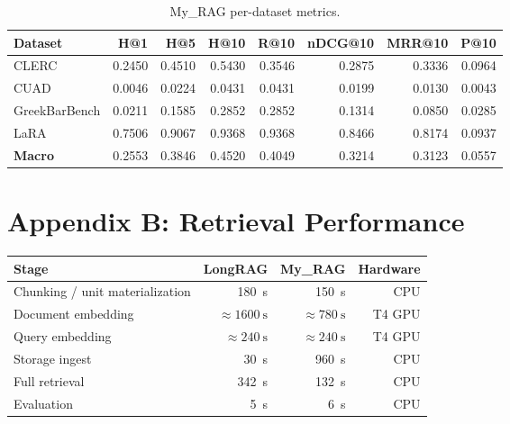 \documentclass[11pt,a4paper]{article}
\begin{document}
\begin{table}[h]
\centering
\caption{My\_RAG per-dataset metrics.}
\small
\begin{tabular}{l r r r r r r r}
\toprule
\textbf{Dataset} & \textbf{H@1} & \textbf{H@5} & \textbf{H@10}
  & \textbf{R@10} & \textbf{nDCG@10} & \textbf{MRR@10} & \textbf{P@10} \\
\midrule
CLERC              & \num{0.2450} & \num{0.4510} & \num{0.5430}
                   & \num{0.3546} & \num{0.2875} & \num{0.3336} & \num{0.0964} \\
CUAD               & \num{0.0046} & \num{0.0224} & \num{0.0431}
                   & \num{0.0431} & \num{0.0199} & \num{0.0130} & \num{0.0043} \\
GreekBarBench      & \num{0.0211} & \num{0.1585} & \num{0.2852}
                   & \num{0.2852} & \num{0.1314} & \num{0.0850} & \num{0.0285} \\
LaRA               & \num{0.7506} & \num{0.9067} & \num{0.9368}
                   & \num{0.9368} & \num{0.8466} & \num{0.8174} & \num{0.0937} \\
\midrule
\textbf{Macro}     & \num{0.2553} & \num{0.3846} & \num{0.4520}
                   & \num{0.4049} & \num{0.3214} & \num{0.3123} & \num{0.0557} \\
\bottomrule
\end{tabular}
\end{table}

\section{Appendix B: Retrieval Performance}

\begin{center}
\small
\begin{tabular}{l r r r}
\toprule
\textbf{Stage} & \textbf{LongRAG} & \textbf{My\_RAG} & \textbf{Hardware} \\
\midrule
Chunking / unit materialization & \SI{180}{\second} & \SI{150}{\second} & CPU \\
Document embedding & $\approx \SI{1600}{\second}$ & $\approx \SI{780}{\second}$ & T4 GPU \\
Query embedding & $\approx \SI{240}{\second}$ & $\approx \SI{240}{\second}$ & T4 GPU \\
Storage ingest & \SI{30}{\second} & \SI{960}{\second} & CPU \\
Full retrieval & \SI{342}{\second} & \SI{132}{\second} & CPU \\
Evaluation & \SI{5}{\second} & \SI{6}{\second} & CPU \\
\bottomrule
\end{tabular}
\end{center}
\end{document}
